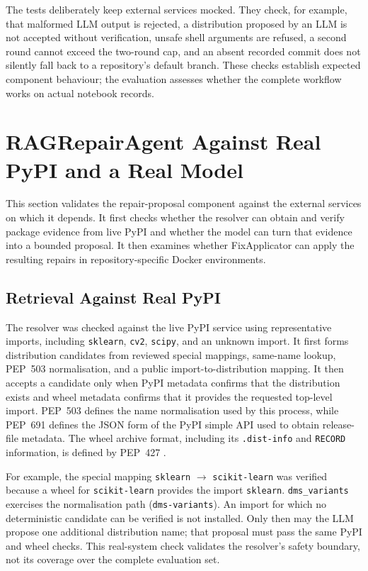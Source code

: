 The tests deliberately keep external services mocked. They check, for example,
that malformed LLM output is rejected, a distribution proposed by an LLM is
not accepted without verification, unsafe shell arguments are refused, a
second round cannot exceed the two-round cap, and an absent recorded commit
does not silently fall back to a repository's default branch. These checks
establish expected component behaviour; the evaluation assesses whether the
complete workflow works on actual notebook records.

\section{RAGRepairAgent Against Real PyPI and a Real Model}
\label{sec:v-i4}

This section validates the repair-proposal component against the external
services on which it depends. It first checks whether the resolver can obtain
and verify package evidence from live PyPI and whether the model can turn that
evidence into a bounded proposal. It then examines whether FixApplicator can
apply the resulting repairs in repository-specific Docker environments.

\subsection{Retrieval Against Real PyPI}

The resolver was checked against the live PyPI service using representative
imports, including \texttt{sklearn}, \texttt{cv2}, \texttt{scipy}, and an
unknown import. It first forms distribution candidates from reviewed special
mappings, same-name lookup, PEP~503 normalisation, and a public
import-to-distribution mapping. It then accepts a candidate only when PyPI
metadata confirms that the distribution exists and wheel metadata confirms
that it provides the requested top-level import. PEP~503 defines the name
normalisation used by this process, while PEP~691 defines the JSON form of
the PyPI simple API used to obtain release-file metadata. The wheel archive
format, including its \texttt{.dist-info} and \texttt{RECORD} information, is
defined by PEP~427 \cite{pep503,pep691,pep427}.

For example, the special mapping \texttt{sklearn} $\rightarrow$
\texttt{scikit-learn} was verified because a wheel for
\texttt{scikit-learn} provides the import \texttt{sklearn}.
\texttt{dms\_variants} exercises the normalisation path
(\texttt{dms-variants}). An import for which no deterministic candidate can
be verified is not installed. Only then may the LLM propose one additional
distribution name; that proposal must pass the same PyPI and wheel checks.
This real-system check validates the resolver's safety boundary, not its
coverage over the complete evaluation set.

